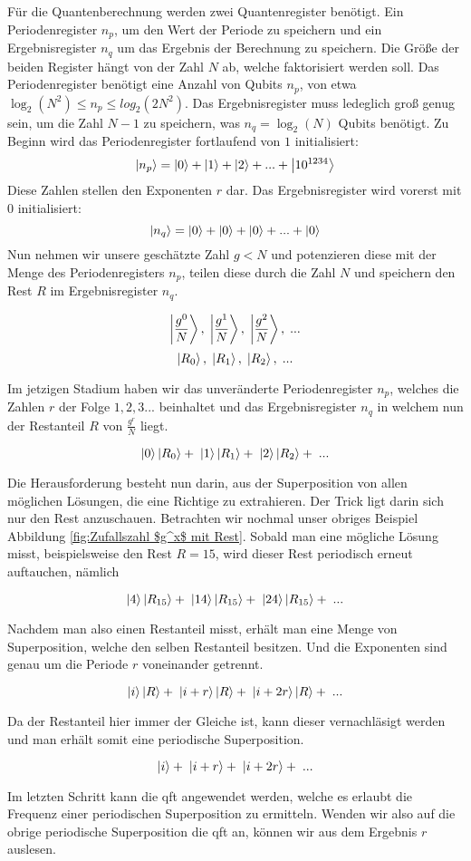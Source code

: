 Für die Quantenberechnung \cite[S.1-2]{amico_experimental_2019} werden zwei Quantenregister benötigt. Ein Periodenregister $n_p$, 
um den Wert der Periode zu speichern und ein Ergebnisregister $n_q$ um das Ergebnis der Berechnung zu speichern. 
Die Größe der beiden Register hängt von der Zahl $N$ ab, welche faktorisiert werden soll. 
Das Periodenregister benötigt eine Anzahl von Qubits $n_p$, von etwa $\log_2(N^2) \le n_p \le log_2(2N^2)$. 
Das Ergebnisregister muss ledeglich groß genug sein, um die Zahl $N-1$ zu speichern, was $n_q = \log_2(N)$ Qubits benötigt.
Zu Beginn wird das Periodenregister fortlaufend von $1$ initialisiert: 
$$\ket{n_p} = \ket{0} + \ket{1} + \ket{2} + ... + \ket{10^{1234}}$$
Diese Zahlen stellen den Exponenten $r$ dar. Das Ergebnisregister wird vorerst mit $0$ initialisiert: 
$$\ket{n_q} = \ket{0} + \ket{0} + \ket{0} + ... + \ket{0}$$
Nun nehmen wir unsere geschätzte Zahl $g < N$ und potenzieren diese mit der Menge des Periodenregisters $n_p$, teilen diese durch die Zahl $N$ 
und speichern den Rest $R$ im Ergebnisregister $n_q$.

$$\ket{\frac{g^0}{N}},\;\ket{\frac{g^1}{N}},\;\ket{\frac{g^2}{N}},\;...$$
$$\ket{R_0},\; \ket{R_1},\; \ket{R_2},\;...$$

Im jetzigen Stadium haben wir das unveränderte Periodenregister $n_p$, welches die Zahlen $r$ der Folge $1, 2, 3...$ beinhaltet 
und das Ergebnisregister $n_q$ in welchem nun der Restanteil $R$ von $\frac{g^r}{N}$ liegt.

$$\ket{0}\ket{R_0} + \;\ket{1}\ket{R_1} + \;\ket{2}\ket{R_2} + \;...$$

Die Herausforderung besteht nun darin, aus der Superposition von allen möglichen Lösungen, die eine Richtige zu extrahieren. 
Der Trick ligt darin sich nur den Rest anzuschauen. Betrachten wir nochmal unser obriges Beispiel Abbildung \ref{fig:Zufallszahl $g^x$ mit Rest}. Sobald man eine mögliche Lösung misst, beispielsweise den Rest $R = 15$, wird dieser Rest periodisch erneut auftauchen, nämlich

$$\ket{4}\ket{R_{15}} + \;\ket{14}\ket{R_{15}} + \;\ket{24}\ket{R_{15}} + \;...$$

Nachdem man also einen Restanteil misst, erhält man eine Menge von Superposition, welche den selben Restanteil besitzen. 
Und die Exponenten sind genau um die Periode $r$ voneinander getrennt.

$$\ket{i}\ket{R} + \;\ket{i+r}\ket{R} + \;\ket{i+2r}\ket{R} + \;...$$

Da der Restanteil hier immer der Gleiche ist, kann dieser vernachläsigt werden und man erhält somit eine periodische Superposition.

$$\ket{i} + \;\ket{i+r} + \;\ket{i+2r} + \;...$$

Im letzten Schritt kann die \ac{qft} angewendet werden, welche es erlaubt die Frequenz einer periodischen Superposition zu ermitteln. \cite[S. 2]{amico_experimental_2019}
Wenden wir also auf die obrige periodische Superposition die \ac{qft} an, können wir aus dem Ergebnis $r$ auslesen.\\


